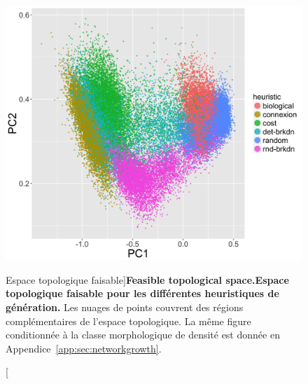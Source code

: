 \begin{figure}
\includegraphics[width=\linewidth]{Figures/Final/7-1-2-fig-networkgrowth-feasiblespace.jpg}
\caption[Feasible topological space][Espace topologique faisable]{\textbf{Feasible topological space.}\label{fig:networkgrowth:feasiblespace}}{\textbf{Espace topologique faisable pour les différentes heuristiques de génération.} Les nuages de points couvrent des régions complémentaires de l'espace topologique. La même figure conditionnée à la classe morphologique de densité est donnée en Appendice~\ref{app:sec:networkgrowth}.\label{fig:networkgrowth:feasiblespace}}
\end{figure}

%



